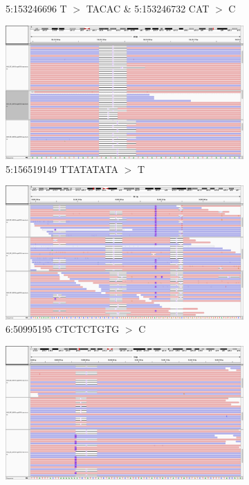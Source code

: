 \documentclass{article}
\begin{document}
\begin{landscape}
\begin{figure}[ht!]
\begin{subfigure}[b]{0.33\textwidth}
        \caption{\tiny 5:153246696 T $>$ TACAC \& 5:153246732 CAT $>$ C}
    \end{subfigure}
    \begin{subfigure}[b]{0.33\textwidth}
        \includegraphics[width=\textwidth]{figures/5_156519149_TTATATATAdel}
        \caption{\tiny 5:156519149 TTATATATA $>$ T}
    \end{subfigure}
    \begin{subfigure}[b]{0.33\textwidth}
        \includegraphics[width=\textwidth]{figures/6_50995195_CTCTCTGTGdel}
        \caption{\tiny 6:50995195 CTCTCTGTG $>$ C}
    \end{subfigure}
    \begin{subfigure}[b]{0.33\textwidth}
        \includegraphics[width=\textwidth]{figures/7_36609076_AATCTins}

\end{subfigure}
\end{figure}
\end{landscape}
\end{document}
